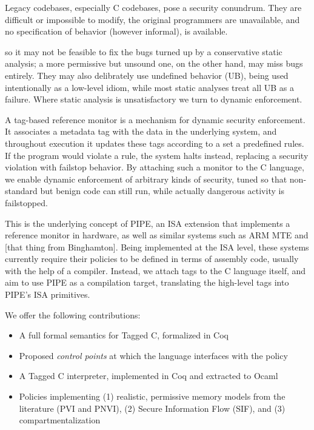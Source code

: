 \documentclass[acmsmall,review,anonymous]{acmart}\settopmatter{printfolios=true,printccs=false,printacmref=false}
\begin{document}
Legacy codebases, especially C codebases, pose a security conundrum. 
They are difficult or impossible to
modify, the original programmers are unavailable, and no specification of behavior (however informal), is available.


so it may not be feasible to fix the bugs
turned up by a conservative static analysis; a more permissive but unsound one, on the other hand,
may miss bugs entirely. They may also delibrately use undefined behavior (UB), being used intentionally
as a low-level idiom, while most static analyses treat all UB as a failure. Where static analysis
is unsatisfactory we turn to dynamic enforcement.

A tag-based reference monitor is a mechanism for dynamic security enforcement. It associates
a metadata tag with the data in the underlying system, and throughout execution it updates these
tags according to a set a predefined rules. If the program would violate a rule, the system halts
instead, replacing a security violation with failstop behavior. By attaching such a monitor to
the C language, we enable dynamic enforcement of arbitrary kinds of security, tuned so that
non-standard but benign code can still run, while actually dangerous activity is failstopped.

This is the underlying concept of PIPE, an ISA extension that implements a reference monitor in
hardware, as well as similar systems such as ARM MTE and [that thing from Binghamton]. Being
implemented at the ISA level, these systems currently require their policies to be defined in terms of
assembly code, usually with the help of a compiler. Instead, we attach tags to the C language
itself, and aim to use PIPE as a compilation target, translating the high-level tags into
PIPE's ISA primitives.

We offer the following contributions:

\begin{itemize}
\item A full formal semantics for Tagged C, formalized in Coq
\item Proposed {\em control points} at which the language interfaces with the policy
\item A Tagged C interpreter, implemented in Coq and extracted to Ocaml
\item Policies implementing (1) realistic, permissive memory models from the literature (PVI and PNVI),
  (2) Secure Information Flow (SIF), and (3) compartmentalization
\end{itemize}
\end{document}
